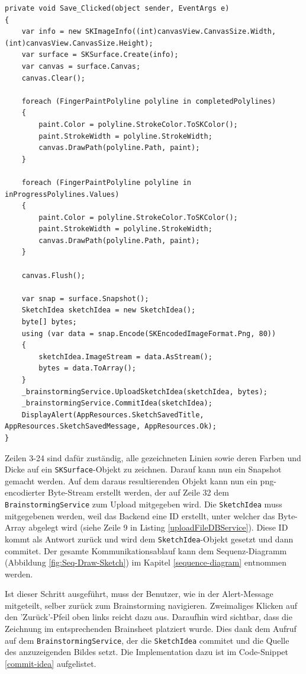 \begin{lstlisting}[label={save-clicked-sketch},caption={Save Click-Eventhandler}]
private void Save_Clicked(object sender, EventArgs e)
{
	var info = new SKImageInfo((int)canvasView.CanvasSize.Width, (int)canvasView.CanvasSize.Height);
	var surface = SKSurface.Create(info);
	var canvas = surface.Canvas;
	canvas.Clear();
	
	foreach (FingerPaintPolyline polyline in completedPolylines)
	{
		paint.Color = polyline.StrokeColor.ToSKColor();
		paint.StrokeWidth = polyline.StrokeWidth;
		canvas.DrawPath(polyline.Path, paint);
	}
	
	foreach (FingerPaintPolyline polyline in inProgressPolylines.Values)
	{
		paint.Color = polyline.StrokeColor.ToSKColor();
		paint.StrokeWidth = polyline.StrokeWidth;
		canvas.DrawPath(polyline.Path, paint);
	}
	
	canvas.Flush();
	
	var snap = surface.Snapshot();
	SketchIdea sketchIdea = new SketchIdea();
	byte[] bytes;
	using (var data = snap.Encode(SKEncodedImageFormat.Png, 80))
	{
		sketchIdea.ImageStream = data.AsStream();
		bytes = data.ToArray();
	}
	_brainstormingService.UploadSketchIdea(sketchIdea, bytes);
	_brainstormingService.CommitIdea(sketchIdea);
	DisplayAlert(AppResources.SketchSavedTitle, AppResources.SketchSavedMessage, AppResources.Ok);
}
\end{lstlisting}
Zeilen 3-24 sind dafür zuständig, alle gezeichneten Linien sowie deren Farben und Dicke auf ein \texttt{SKSurface}-Objekt zu zeichnen. Darauf kann nun ein Snapshot gemacht werden. Auf dem daraus resultierenden Objekt kann nun ein png-encodierter Byte-Stream erstellt werden, der auf Zeile 32 dem \texttt{BrainstormingService} zum Upload mitgegeben wird. Die \texttt{SketchIdea} muss mitgegebenen werden, weil das Backend eine ID erstellt, unter welcher das Byte-Array abgelegt wird (siehe Zeile 9 in Listing \ref{uploadFileDBService}). Diese ID kommt als Antwort zurück und wird dem \texttt{SketchIdea}-Objekt gesetzt und dann commitet. Der gesamte Kommunikationsablauf kann dem Sequenz-Diagramm (Abbildung \ref{fig:Seq-Draw-Sketch}) im Kapitel \ref{sequence-diagram} entnommen werden. 

Ist dieser Schritt ausgeführt, muss der Benutzer, wie in der Alert-Message mitgeteilt, selber zurück zum Brainstorming navigieren. Zweimaliges Klicken auf den 'Zurück'-Pfeil oben links reicht dazu aus. Daraufhin wird sichtbar, dass die Zeichnung im entsprechenden Brainsheet platziert wurde. Dies dank dem Aufruf auf dem \texttt{BrainstormingService}, der die \texttt{SketchIdea} commitet und die Quelle des anzuzeigenden Bildes setzt. Die Implementation dazu ist im Code-Snippet \ref{commit-idea} aufgelistet.

